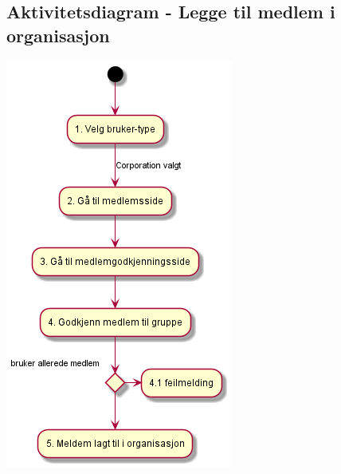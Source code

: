 \documentclass[12pt]{article}
\begin{document}
    \subsection{Aktivitetsdiagram - Legge til medlem i organisasjon}
    \includegraphics[max width=\textwidth]{bilder/diagrammer/aktivitet_medlem.png}
    
\end{document}
